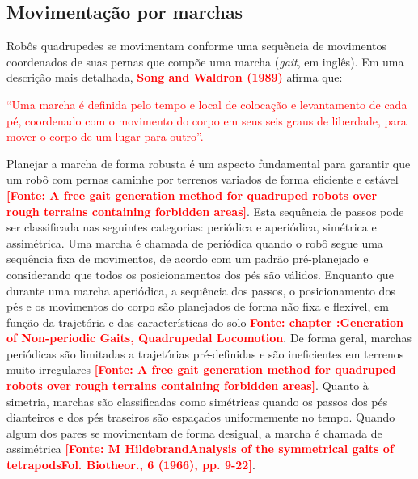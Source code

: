 \documentclass[../main.tex]{subfiles}
\begin{document}
  \subsection{Movimentação por marchas}
  Robôs quadrupedes se movimentam conforme uma sequência de movimentos coordenados de suas pernas que compõe uma marcha (\textit{gait}, em inglês). Em uma descrição mais detalhada, \textbf{\textcolor{red}{Song and Waldron (1989)}} afirma que: 

  \textcolor{red}{“Uma marcha é definida pelo tempo e local de colocação e levantamento de cada pé, coordenado com o movimento do corpo em seus seis graus de liberdade, para mover o corpo de um lugar para outro”.}

  Planejar a marcha de forma robusta é um aspecto fundamental para garantir que um robô com pernas caminhe por terrenos variados de forma eficiente e estável \textbf{\textcolor{red}{[Fonte: A free gait generation method for quadruped robots over rough terrains containing forbidden areas]}}. Esta sequência de passos pode ser classificada nas seguintes categorias: periódica e aperiódica, simétrica e assimétrica. Uma marcha é chamada de periódica quando o robô segue uma sequência fixa de movimentos, de acordo com um padrão pré-planejado e considerando que todos os posicionamentos dos pés são válidos. Enquanto que durante uma marcha aperiódica, a sequência dos passos, o posicionamento dos pés e os movimentos do corpo são planejados de forma não fixa e flexível, em função da trajetória e das características do solo \textbf{\textcolor{red}{Fonte: chapter :Generation of Non-periodic Gaits, Quadrupedal Locomotion}}. De forma geral, marchas periódicas são limitadas a trajetórias pré-definidas e são ineficientes em terrenos muito irregulares \textbf{\textcolor{red}{[Fonte: A free gait generation method for quadruped robots over rough terrains containing forbidden areas]}}. Quanto à simetria, marchas são classificadas como simétricas quando os passos dos pés dianteiros e dos pés traseiros são espaçados uniformemente no tempo. Quando algum dos pares se movimentam de forma desigual, a marcha é chamada de assimétrica \textbf{\textcolor{red}{[Fonte: M HildebrandAnalysis of the symmetrical gaits of tetrapodsFol. Biotheor., 6 (1966), pp. 9-22]}}.
\end{document}
